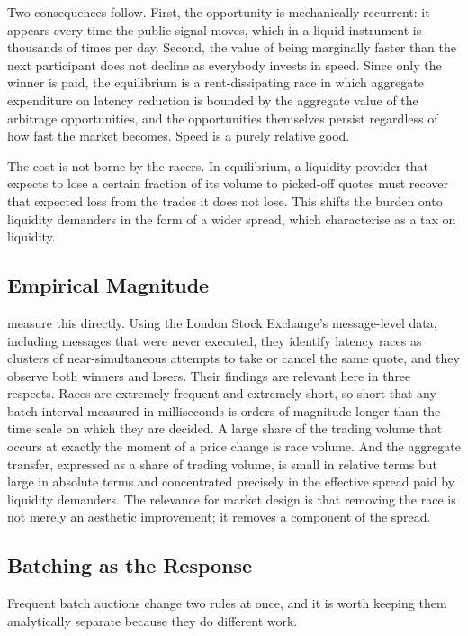 Two consequences follow. First, the opportunity is mechanically
recurrent: it appears every time the public signal moves, which in a
liquid instrument is thousands of times per day. Second, the value of
being marginally faster than the next participant does not decline as
everybody invests in speed. Since only the winner is paid, the
equilibrium is a rent-dissipating race in which aggregate expenditure on
latency reduction is bounded by the aggregate value of the arbitrage
opportunities, and the opportunities themselves persist regardless of
how fast the market becomes. Speed is a purely relative good.

The cost is not borne by the racers. In equilibrium, a liquidity
provider that expects to lose a certain fraction of its volume to
picked-off quotes must recover that expected loss from the trades it
does not lose. This shifts the burden onto liquidity demanders in the
form of a wider spread, which \citet{budish2015hft} characterise as a
tax on liquidity.

\subsection{Empirical Magnitude}

\citet{aquilina2022quantifying} measure this directly. Using the London
Stock Exchange's message-level data, including messages that were never
executed, they identify latency races as clusters of near-simultaneous
attempts to take or cancel the same quote, and they observe both winners
and losers. Their findings are relevant here in three respects. Races
are extremely frequent and extremely short, so short that any batch
interval measured in milliseconds is orders of magnitude longer than the
time scale on which they are decided. A large share of the trading
volume that occurs at exactly the moment of a price change is race
volume. And the aggregate transfer, expressed as a share of trading
volume, is small in relative terms but large in absolute terms and
concentrated precisely in the effective spread paid by liquidity
demanders. The relevance for market design is that removing the race is
not merely an aesthetic improvement; it removes a component of the
spread.

\subsection{Batching as the Response}

Frequent batch auctions change two rules at once, and it is worth
keeping them analytically separate because they do different work.

